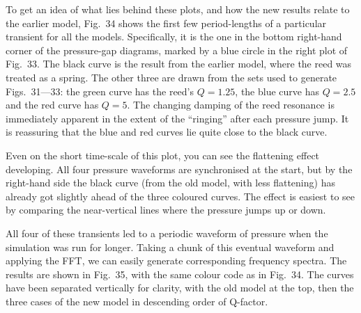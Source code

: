   To get an idea of what lies behind these plots, and how the new results 
  relate to the earlier model, Fig.\ 34 shows the first few period-lengths of a 
  particular transient for all the models. Specifically, it is the one in the 
  bottom right-hand corner of the pressure-gap diagrams, marked by a blue 
  circle in the right plot of Fig.\ 33. The black curve is the result from the 
  earlier model, where the reed was treated as a spring. The other three are 
  drawn from the sets used to generate Figs.\ 31—33: the green curve has the 
  reed’s $Q=1.25$, the blue curve has $Q=2.5$ and the red curve has $Q=5$. The 
  changing damping of the reed resonance is immediately apparent in the extent 
  of the “ringing” after each pressure jump. It is reassuring that the blue and 
  red curves lie quite close to the black curve. 


  Even on the short time-scale of this plot, you can see the flattening effect 
  developing. All four pressure waveforms are synchronised at the start, but by 
  the right-hand side the black curve (from the old model, with less 
  flattening) has already got slightly ahead of the three coloured curves. The 
  effect is easiest to see by comparing the near-vertical lines where the 
  pressure jumps up or down. 

  All four of these transients led to a periodic waveform of pressure when the 
  simulation was run for longer. Taking a chunk of this eventual waveform and 
  applying the FFT, we can easily generate corresponding frequency spectra. The 
  results are shown in Fig.\ 35, with the same colour code as in Fig.\ 34. The 
  curves have been separated vertically for clarity, with the old model at the 
  top, then the three cases of the new model in descending order of Q-factor. 


